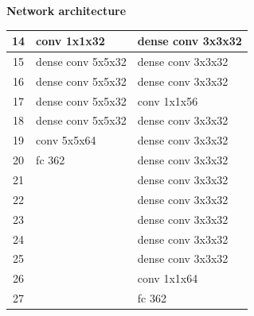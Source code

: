 \documentclass[xcolor=dvipsnames]{beamer}
\begin{document}
\begin{frame}{\bf Network architecture}
{\begin{table}[]
\begin{tabular}{|c|l|l|}
14             & \cellcolor[HTML]{38FFF8}conv 1x1x32       & \cellcolor[HTML]{FD6864}dense conv 3x3x32 \\ \hline
15             & \cellcolor[HTML]{FD6864}dense conv 5x5x32 & \cellcolor[HTML]{FD6864}dense conv 3x3x32 \\ \hline
16             & \cellcolor[HTML]{FD6864}dense conv 5x5x32 & \cellcolor[HTML]{FD6864}dense conv 3x3x32 \\ \hline
17             & \cellcolor[HTML]{FD6864}dense conv 5x5x32 & \cellcolor[HTML]{38FFF8}conv 1x1x56       \\ \hline
18             & \cellcolor[HTML]{FD6864}dense conv 5x5x32 & \cellcolor[HTML]{FD6864}dense conv 3x3x32 \\ \hline
19             & \cellcolor[HTML]{38FFF8}conv 5x5x64       & \cellcolor[HTML]{FD6864}dense conv 3x3x32 \\ \hline
20             & \cellcolor[HTML]{67FD9A}fc 362            & \cellcolor[HTML]{FD6864}dense conv 3x3x32 \\ \hline
21             &                                           & \cellcolor[HTML]{FD6864}dense conv 3x3x32 \\ \hline
22             &                                           & \cellcolor[HTML]{FD6864}dense conv 3x3x32 \\ \hline
23             &                                           & \cellcolor[HTML]{FD6864}dense conv 3x3x32 \\ \hline
24             &                                           & \cellcolor[HTML]{FD6864}dense conv 3x3x32 \\ \hline
25             &                                           & \cellcolor[HTML]{FD6864}dense conv 3x3x32 \\ \hline
26             &                                           & \cellcolor[HTML]{38FFF8}conv 1x1x64       \\ \hline
27             &                                           & \cellcolor[HTML]{67FD9A}fc 362            \\ \hline
\end{tabular}
\end{table}
}


\end{frame}
\end{document}
